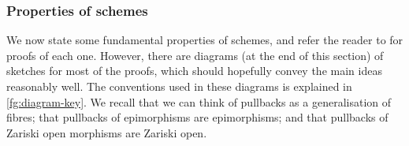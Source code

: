         





    \subsubsection{Properties of schemes} %
    \label{ssub:properties_of_schemes}

        We now state some fundamental properties of schemes, and refer the reader to \cite{Toen:2005wxa} for proofs of each one.
        However, there are diagrams (at the end of this section) of sketches for most of the proofs, which should hopefully convey the main ideas reasonably well.
        The conventions used in these diagrams is explained in \cref{fg:diagram-key}.
        We recall that we can think of pullbacks as a generalisation of fibres; that pullbacks of epimorphisms are epimorphisms; and that pullbacks of Zariski open morphisms are Zariski open.
        


